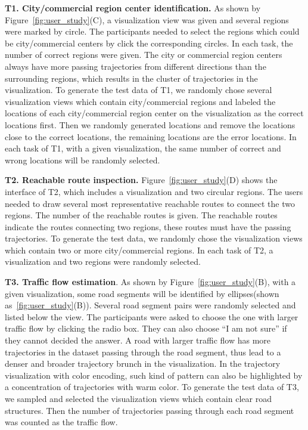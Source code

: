 \textbf{T1. City/commercial region center identification.} 
As shown by Figure~\ref{fig:user_study}(C), a visualization view was given and several regions were marked by circle. The participants needed to select the regions which could be city/commercial centers by click the corresponding circles. In each task, the number of correct regions were given. 
The city or commercial region centers always have more passing trajectories from different directions than the surrounding regions, which results in the  cluster of trajectories in the visualization. 
To generate the test data of T1, we randomly chose several visualization views which contain city/commercial regions and labeled the locations of each city/commercial region center on the visualization as the correct locations first.  Then we randomly generated locations and remove the locations close to the correct locations, the remaining locations are the error locations. In each task of T1, with a given visualization, the same number of correct and wrong locations will be randomly selected. 

\textbf{T2. Reachable route inspection.} 
Figure~\ref{fig:user_study}(D) shows the interface of T2, which includes a visualization and two circular regions. The users needed to draw several most representative reachable routes to connect the two regions. The number of the reachable routes is given. 
The reachable routes indicate the routes connecting two regions, these routes must have the passing trajectories. 
To generate the test data, we randomly chose the visualization views which contain two or more city/commercial regions. In each task of T2, a visualization and two regions were randomly selected.

\textbf{T3. Traffic flow estimation}. 
As shown by Figure~\ref{fig:user_study}(B), with a given visualization, some road segments will be identified by ellipses(shown as~\ref{fig:user_study}(B)). Several road segment pairs were randomly selected and listed below the view. The participants were asked to choose the one with larger traffic flow by clicking the radio box. They can also choose ``I am not sure'' if they cannot decided the answer. 
A road with larger traffic flow has more trajectories in the dataset passing through the road segment, thus lead to a denser and broader trajectory brunch in the visualization. In the trajectory visualization with color encoding, such kind of pattern can also be highlighted by a concentration of trajectories with warm color. 
To generate the test data of T3,  we sampled and selected the visualization views which contain clear road structures. Then the number of trajectories passing through each road segment was counted as the traffic flow. 

